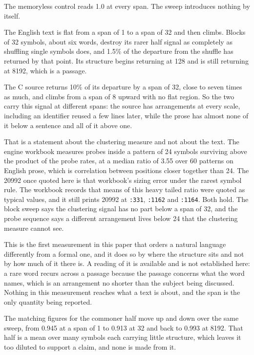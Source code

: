 The memoryless control reads 1.0 at every span. The sweep introduces nothing by itself.

The English text is flat from a span of 1 to a span of 32 and then climbs. Blocks of 32 symbols, about six words, destroy its rarer half signal as completely as shuffling single symbols does, and 1.5\% of the departure from the shuffle has returned by that point. Its structure begins returning at 128 and is still returning at 8192, which is a passage.

The C source returns 10\% of its departure by a span of 32, close to seven times as much, and climbs from a span of 8 upward with no flat region. So the two carry this signal at different spans: the source has arrangements at every scale, including an identifier reused a few lines later, while the prose has almost none of it below a sentence and all of it above one.

That is a statement about the clustering measure and not about the text. The engine workbook measures probes inside a pattern of 24 symbols surviving above the product of the probe rates, at a median ratio of 3.55 over 60 patterns on English prose, which is correlation between positions closer together than 24. The 20992 once quoted here is that workbook's sizing error under the rarest symbol rule. The workbook records that means of this heavy tailed ratio were quoted as typical values, and it still prints 20992 at \texttt{:331}, \texttt{:1162} and \texttt{:1164}. Both hold. The block sweep says the clustering signal has no part below a span of 32, and the probe sequence says a different arrangement lives below 24 that the clustering measure cannot see.

This is the first measurement in this paper that orders a natural language differently from a formal one, and it does so by where the structure sits and not by how much of it there is. A reading of it is available and is not established here: a rare word recurs across a passage because the passage concerns what the word names, which is an arrangement no shorter than the subject being discussed. Nothing in this measurement reaches what a text is about, and the span is the only quantity being reported.

The matching figures for the commoner half move up and down over the same sweep, from 0.945 at a span of 1 to 0.913 at 32 and back to 0.993 at 8192. That half is a mean over many symbols each carrying little structure, which leaves it too diluted to support a claim, and none is made from it.

